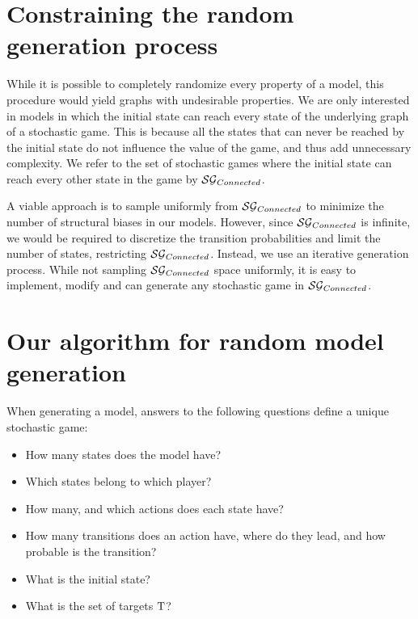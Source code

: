 
\section{Constraining the random generation process}
While it is possible to completely randomize every property of a model, this procedure would yield graphs with undesirable properties. 
We are only interested in models in which the initial state can reach every state of the underlying graph of a stochastic game. 
This is because all the states that can never be reached by the initial state do not influence the value of the game, and thus add unnecessary complexity.
We refer to the set of stochastic games where the initial state can reach every other state in the game by $\mathcal{SG}_{Connected}$.

A viable approach is to sample uniformly from $\mathcal{SG}_{Connected}$ to minimize the number of structural biases in our models.
However, since $\mathcal{SG}_{Connected}$ is infinite, we would be required to discretize the transition probabilities and limit the number of states,
restricting $\mathcal{SG}_{Connected}$.
Instead, we use an iterative generation process.
While not sampling $\mathcal{SG}_{Connected}$ space uniformly, it is easy to implement, modify and can generate any stochastic game in $\mathcal{SG}_{Connected}$.

\section{Our algorithm for random model generation} \label{sec:randomGenAlgo}
When generating a model, answers to the following questions define a unique stochastic game:
\begin{itemize}
    \item How many states does the model have?
    \item Which states belong to which player?
    \item How many, and which actions does each state have?
    \item How many transitions does an action have, where do they lead, and how probable is the transition?
    \item What is the initial state?
    \item What is the set of targets $\mathrm{T}$?
\end{itemize}

